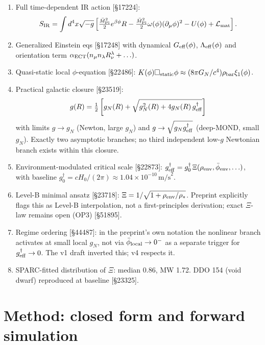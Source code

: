 \documentclass[11pt]{article}
\begin{document}
\begin{enumerate}
\item[{[A1]}] Full time-dependent IR action [\S17224]:
$$
S_{\rm IR}=\int d^4x\sqrt{-g}\left[\tfrac{\bar M_{\rm Pl}^2}{2}e^{\beta\phi}R
-\tfrac{\bar M_{\rm Pl}^2}{2}\omega(\phi)(\partial_\mu\phi)^2 - U(\phi)+\mathcal L_{\rm mat}\right].
$$

\item[{[A2]}] Generalized Einstein eqs [\S17248] with dynamical
$G_{\rm eff}(\phi)$, $\Lambda_{\rm eff}(\phi)$ and orientation term
$\alpha_{\rm ECT}(n_\mu n_\lambda R^\lambda_\nu + \ldots)$.

\item[{[A3]}] Quasi-static local $\phi$-equation [\S22486]:
$K(\phi)\Box_{\rm static}\phi \approx (8\pi G_N/c^4)\rho_{\rm bar}\xi_1(\phi)$.

\item[{[A4]}] Practical galactic closure [\S23519]:
$$
g(R)=\tfrac{1}{2}\left[g_N(R)+\sqrt{g_N^2(R)+4g_N(R)\,g^\dagger_{\rm eff}}\right]
$$
with limits $g\to g_N$ (Newton, large $g_N$) and $g\to\sqrt{g_N g^\dagger_{\rm eff}}$
(deep-MOND, small $g_N$). Exactly two asymptotic branches; no third
independent low-$g$ Newtonian branch exists within this closure.

\item[{[A5]}] Environment-modulated critical scale [\S22873]:
$g^\dagger_{\rm eff} = g^\dagger_0\,\Xi(\rho_{\rm env}, \bar\phi_{\rm env},\ldots)$,
with baseline $g^\dagger_0 = cH_0/(2\pi)\approx 1.04\times 10^{-10}\,\text{m/s}^2$.

\item[{[A6]}] Level-B minimal ansatz [\S23718]:
$\Xi = 1/\sqrt{1+\rho_{\rm env}/\rho_*}$. Preprint explicitly flags this
as Level-B interpolation, not a first-principles derivation; exact
$\Xi$-law remains open (OP3) [\S51895].

\item[{[A7]}] Regime ordering [\S44487]: in the preprint's own notation
the nonlinear branch activates at small local $g_N$, not via
$\bar\phi_{\rm local}\to 0^-$ as a separate trigger for
$g^\dagger_{\rm eff}\to 0$. The v1 draft inverted this; v4 respects it.

\item[{[A8]}] SPARC-fitted distribution of $\Xi$: median 0.86, MW 1.72.
DDO 154 (void dwarf) reproduced at baseline [\S23325].
\end{enumerate}

\section{Method: closed form and forward simulation}
\end{document}
